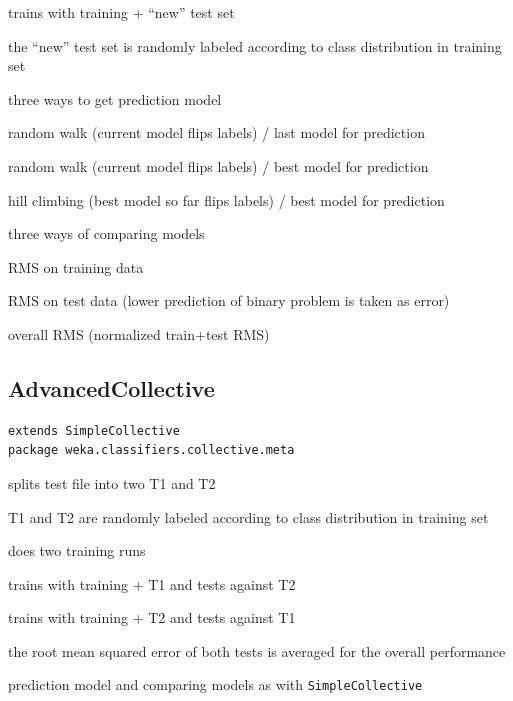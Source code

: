 \documentclass[a4paper]{book}
\begin{document}
\begin{tight_itemize}
	\item trains with training + ``new'' test set
	\item the ``new'' test set is randomly labeled according to class distribution in training set
	\item three ways to get prediction model
	\begin{tight_enumerate}
		\item random walk (current model flips labels) / last model for prediction
		\item random walk (current model flips labels) / best model for prediction
		\item hill climbing (best model so far flips labels) / best model for prediction
	\end{tight_enumerate}
	\item three ways of comparing models
	\begin{tight_enumerate}
		\item RMS on training data
		\item RMS on test data (lower prediction of binary problem is taken as error)
		\item overall RMS (normalized train+test RMS)
	\end{tight_enumerate}
\end{tight_itemize}

\subsection{AdvancedCollective}
\begin{verbatim}
extends SimpleCollective
package weka.classifiers.collective.meta
\end{verbatim}

\begin{tight_itemize}
	\item splits test file into two T1 and T2
	\item T1 and T2 are randomly labeled according to class distribution in training set
	\item does two training runs
	\begin{tight_itemize}
		\item trains with training + T1 and tests against T2
		\item trains with training + T2 and tests against T1
	\end{tight_itemize}
	\item the root mean squared error of both tests is averaged for the overall performance
	\item prediction model and comparing models as with \texttt{SimpleCollective}
\end{tight_itemize}
\end{document}
